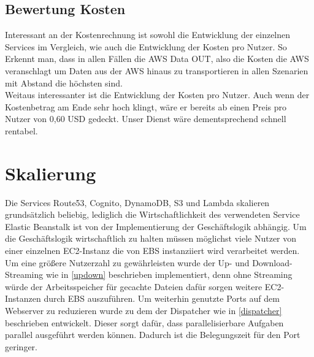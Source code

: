 \documentclass[a4paper, 12pt]{scrreprt}
\renewcommand\_{\textunderscore\allowbreak}
\begin{document}
\subsection{Bewertung Kosten}
Interessant an der Kostenrechnung ist sowohl die Entwicklung der einzelnen Services im Vergleich, wie auch die Entwicklung der Kosten pro Nutzer. So Erkennt man, dass in allen Fällen die AWS Data OUT, also die Kosten die AWS veranschlagt um Daten aus der AWS hinaus zu transportieren in allen Szenarien mit Abstand die höchsten sind. \\
Weitaus interessanter ist die Entwicklung der Kosten pro Nutzer. Auch wenn der Kostenbetrag am Ende sehr hoch klingt, wäre er bereits ab einen Preis pro Nutzer von 0,60 USD gedeckt. Unser Dienst wäre dementsprechend schnell rentabel.




\section{Skalierung}
Die Services Route53, Cognito, DynamoDB, S3 und Lambda skalieren grundsätzlich beliebig, lediglich die Wirtschaftlichkeit des verwendeten Service Elastic Beanstalk ist von der Implementierung der Geschäftslogik abhängig. Um die Geschäftslogik wirtschaftlich zu halten müssen möglichst viele Nutzer von einer einzelnen EC2-Instanz die von EBS instanziiert wird verarbeitet werden. Um eine größere Nutzerzahl zu gewährleisten wurde der Up- und Download-Streaming wie in \ref{updown} beschrieben implementiert, denn ohne Streaming würde der Arbeitsspeicher für gecachte Dateien dafür sorgen weitere EC2-Instanzen durch EBS auszuführen.
Um weiterhin genutzte Ports auf dem Webserver zu reduzieren wurde zu dem der Dispatcher wie in \ref{dispatcher} beschrieben entwickelt. Dieser sorgt dafür, dass parallelisierbare Aufgaben parallel ausgeführt werden können. Dadurch ist die Belegungszeit für den Port geringer.\\

   
\end{document}
